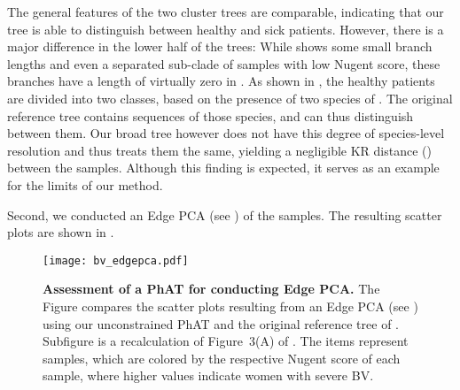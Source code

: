 The general features of the two cluster trees are comparable,
indicating that our tree is able to distinguish between healthy and sick patients.
However, there is a major difference in the lower half of the trees:
While  shows some small branch lengths and even a separated sub-clade
of samples with low Nugent score,
these branches have a length of virtually zero in .
As shown in \citep{Srinivasan2012}, the healthy patients are divided into two classes,
based on the presence of two species of .
The original reference tree contains sequences of those species, and can thus distinguish between them.
Our broad  tree however
does not have this degree of species-level resolution and thus treats them the same,
yielding a negligible KR distance ()
between the samples.
Although this finding is expected, it serves as an example for the limits of our method.

Second, we conducted an Edge PCA \citep{Matsen2011a}
(see )
of the samples.
The resulting scatter plots are shown in .

\begin{figure}[hpbt]
    \centering
    \texttt{[image: bv\_edgepca.pdf]}
    \begin{subfigure}{0pt}
        \label{fig:bv_edgepca:sub:edgepca_art}
    \end{subfigure}
    \begin{subfigure}{0pt}
        \label{fig:bv_edgepca:sub:edgepca_orig}
    \end{subfigure}
    \caption[Assessment of a \acs{PhAT} for conducting Edge PCA]{
        \textbf{Assessment of a \acs{PhAT} for conducting Edge PCA.}
        The Figure compares the scatter plots resulting from an Edge PCA
        (see )
        using  our unconstrained  \acs{PhAT} and
         the original reference tree of \citep{Srinivasan2012}.
        Subfigure  is a recalculation of Figure~3(A) of \citep{Srinivasan2012}.
        The items represent samples, which are colored by the respective Nugent score of each sample,
        where higher values indicate women with severe \acl{BV}.
    }
    \label{fig:bv_edgepca}
\end{figure}

